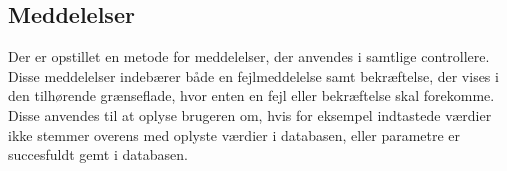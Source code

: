 \subsection*{Meddelelser}
Der er opstillet en metode for meddelelser, der anvendes i samtlige controllere. Disse meddelelser indebærer både en fejlmeddelelse samt bekræftelse, der vises i den tilhørende grænseflade, hvor enten en fejl eller bekræftelse skal forekomme.
Disse anvendes til at oplyse brugeren om, hvis for eksempel indtastede værdier ikke stemmer overens med oplyste værdier i databasen, eller parametre er succesfuldt gemt i databasen.  